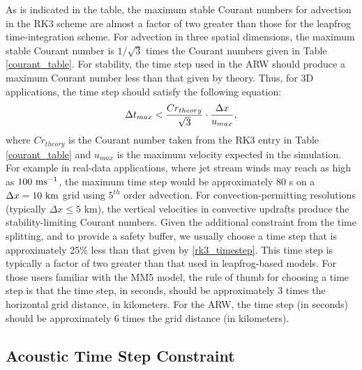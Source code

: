 As is indicated in the table, the maximum stable Courant numbers for
advection in the RK3 scheme are almost a factor of two greater than
those for the leapfrog time-integration scheme.  For advection in three
spatial dimensions, the maximum stable Courant number is $1/\sqrt{3}$
times the Courant numbers given in Table \ref{courant_table}.  For
stability, the time step used in the ARW should produce a maximum
Courant number less than that given by theory.  Thus, for 3D
applications, the time step should satisfy the following equation:
%
\begin{equation}
\Delta t_{max} < {Cr_{theory} \over \sqrt{3}} \cdot {\Delta x \over
u_{max}},
\label{rk3_timestep}
\end{equation}
%
\noindent
where $Cr_{theory}$ is the Courant number taken from the RK3 entry in
Table \ref{courant_table} and $u_{max}$ is the maximum velocity expected
in the simulation.  For example in real-data applications, where jet
stream winds may reach as high as $100\,\,\hbox{ms}^{-1}$, the maximum
time step would be approximately 80 s on a $\Delta x = 10 \,\,\hbox{km}$ grid 
using $5^{th}$ order advection.  For convection-permitting resolutions
(typically $\Delta x \le 5$ km), the vertical velocities in convective
updrafts produce the stability-limiting Courant numbers.
Given the additional constraint from the time splitting, and to provide a
safety buffer, we usually choose a time step that is approximately 25\%
less than that given by \eqref{rk3_timestep}.  This time step is
typically a factor of two greater than that used in leapfrog-based
models.  For those users familiar with the MM5 model, the rule of thumb
for choosing a time step is that the time step, in seconds, should be 
approximately 3 times the horizontal grid distance, in kilometers.
For the ARW, the time step (in seconds) should be approximately 
6 times the grid distance (in kilometers).  

\subsection{Acoustic Time Step Constraint}
\label{acoustic_step_constraint}

